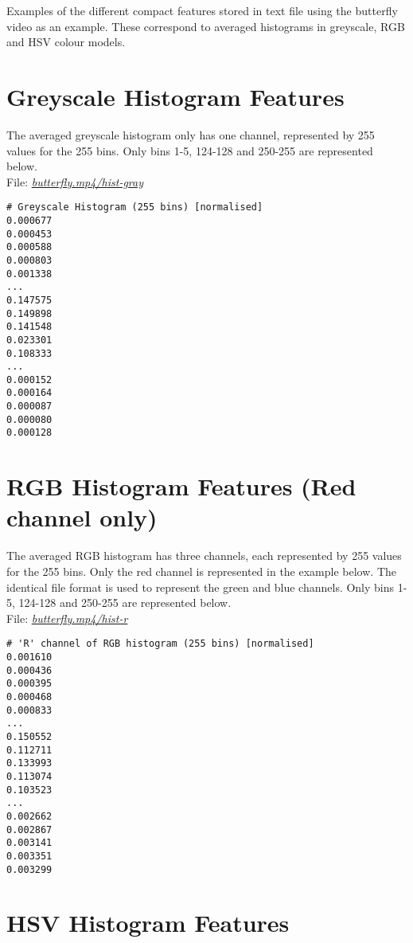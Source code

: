 Examples of the different compact features stored in text file using the butterfly video as an example. These correspond to averaged histograms in greyscale, RGB and HSV colour models.


\section{Greyscale Histogram Features}
\label{sec:appendix-txt-greyscale}

The averaged greyscale histogram only has one channel, represented by 255 values for the 255 bins. Only bins 1-5, 124-128 and 250-255 are represented below.\\

File: \underline{\textit{butterfly.mp4/hist-gray}}

\begin{lstlisting}
# Greyscale Histogram (255 bins) [normalised]
0.000677
0.000453
0.000588
0.000803
0.001338
...
0.147575
0.149898
0.141548
0.023301
0.108333
...
0.000152
0.000164
0.000087
0.000080
0.000128
\end{lstlisting}


\section{RGB Histogram Features (Red channel only)}
\label{sec:appendix-txt-rgb}

The averaged RGB histogram has three channels, each represented by 255 values for the 255 bins. Only the red channel is represented in the example below. The identical file format is used to represent the green and blue channels. Only bins 1-5, 124-128 and 250-255 are represented below.\\

File: \underline{\textit{butterfly.mp4/hist-r}}

\begin{lstlisting}
# 'R' channel of RGB histogram (255 bins) [normalised]
0.001610
0.000436
0.000395
0.000468
0.000833
...
0.150552
0.112711
0.133993
0.113074
0.103523
...
0.002662
0.002867
0.003141
0.003351
0.003299
\end{lstlisting}


\section{HSV Histogram Features}
\label{sec:appendix-txt-hsv}


